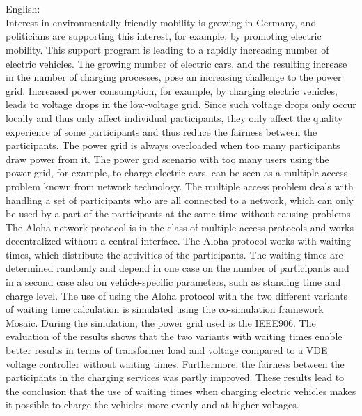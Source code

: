 \\ \\
English: \\
Interest in environmentally friendly mobility is growing in Germany, and politicians are supporting this interest, for example, by promoting electric mobility. This support program is leading to a rapidly increasing number of electric vehicles. The growing number of electric cars, and the resulting increase in the number of charging processes, pose an increasing challenge to the power grid. Increased power consumption, for example, by charging electric vehicles, leads to voltage drops in the low-voltage grid. Since such voltage drops only occur locally and thus only affect individual participants, they only affect the quality experience of some participants and thus reduce the fairness between the participants. The power grid is always overloaded when too many participants draw power from it. The power grid scenario with too many users using the power grid, for example, to charge electric cars, can be seen as a multiple access problem known from network technology. The multiple access problem deals with handling a set of participants who are all connected to a network, which can only be used by a part of the participants at the same time without causing problems. The Aloha network protocol is in the class of multiple access protocols and works decentralized without a central interface. The Aloha protocol works with waiting times, which distribute the activities of the participants. The waiting times are determined randomly and depend in one case on the number of participants and in a second case also on vehicle-specific parameters, such as standing time and charge level. The use of using the Aloha protocol with the two different variants of waiting time calculation is simulated using the co-simulation framework Mosaic. During the simulation, the power grid used is the IEEE906. The evaluation of the results shows that the two variants with waiting times enable better results in terms of transformer load and voltage compared to a VDE voltage controller without waiting times. Furthermore, the fairness between the participants in the charging services was partly improved. These results lead to the conclusion that the use of waiting times when charging electric vehicles makes it possible to charge the vehicles more evenly and at higher voltages.  
